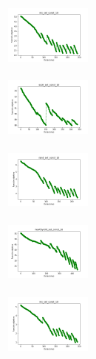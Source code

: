\begin{figure}[H]
    \centering
    \begin{subfigure}
        \centering
        \includegraphics[width=0.234\textwidth]{img/ils/iris_set_const_10_949004259_cost.png}
    \end{subfigure}
    \hfill
    \begin{subfigure}
        \centering
        \includegraphics[width=0.234\textwidth]{img/ils/ecoli_set_const_10_949004259_cost.png}
    \end{subfigure}
    \hfill
    \begin{subfigure}
        \centering
        \includegraphics[width=0.234\textwidth]{img/ils/rand_set_const_10_949004259_cost.png}
    \end{subfigure}
    \hfill
    \begin{subfigure}
        \centering
        \includegraphics[width=0.234\textwidth]{img/ils/newthyroid_set_const_10_949004259_cost.png}
    \end{subfigure}
    \hfill
    \begin{subfigure}
        \centering
        \includegraphics[width=0.234\textwidth]{img/ils/iris_set_const_10_589741062_cost.png}
    \end{subfigure}
    \hfill
    \begin{subfigure}

\end{subfigure}
\end{figure}
